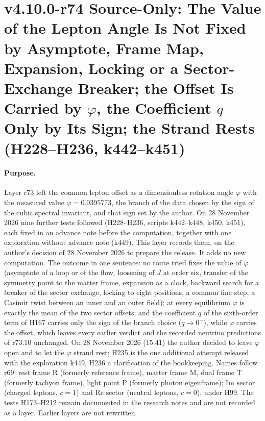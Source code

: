 
\clearpage
\section*{v4.10.0-r74 Source-Only: The Value of the Lepton Angle Is Not Fixed by Asymptote, Frame Map, Expansion, Locking or a Sector-Exchange Breaker; the Offset Is Carried by \texorpdfstring{\(\varphi\)}{phi}, the Coefficient \texorpdfstring{\(q\)}{q} Only by Its Sign; the Strand Rests (H228--H236, k442--k451)}
\label{sec:v4100-r74-phi-strand-rests}

\paragraph{Purpose.}
Layer r73 left the common lepton offset as a dimensionless rotation angle \(\varphi\) with the measured value \(\varphi=0.0395773\), the branch
of the data chosen by the sign of the cubic spectral invariant, and that sign set by the author.  On 28 November 2026 nine further tests
followed (H228--H236, scripts k442--k448, k450, k451), each fixed in an advance note before the computation, together with one exploration
without advance note (k449).  This layer records them, on the author's decision of 28 November 2026 to prepare the release.  It adds no new
computation.  The outcome in one sentence: no route tried fixes the value of \(\varphi\) (asymptote of a loop or of the flow, loosening of \(J\)
at order six, transfer of the symmetry point to the matter frame, expansion as a clock, backward search for a breaker of the sector exchange,
locking to eight positions, a common fine step, a Casimir twist between an inner and an outer field); at every equilibrium \(\varphi\) is
exactly the mean of the two sector offsets; and the coefficient \(q\) of the sixth-order term of H167 carries only the sign of the branch choice
(\(q\to0^-\)), while \(\varphi\) carries the offset, which leaves every earlier verdict and the recorded neutrino predictions of r73.10
unchanged.  On 28 November 2026 (15:41) the author decided to leave \(\varphi\) open and to let the \(\varphi\) strand rest; H235 is the one
additional attempt released with the exploration k449, H236 a clarification of the bookkeeping.  Names follow r69: rest frame R (formerly
reference frame), matter frame M, dual frame T (formerly tachyon frame), light point P (formerly photon eigenframe); Im sector (charged
leptons, \(c=1\)) and Re sector (neutral leptons, \(c=0\)), under H99.  The tests H173--H212 remain documented in the research notes and are not
recorded as a layer.  Earlier layers are not rewritten.

